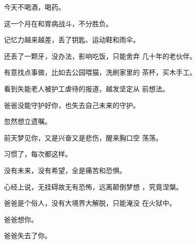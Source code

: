 \documentclass{article}
\begin{document}
\newpage

今天不喝酒，喝药。 


这一个月在和胃病战斗，不分胜负。 

记忆力越来越差，丢了钥匙、运动鞋和雨伞。

还丢了一颗牙，没办法，影响吃饭，只能舍弃
几十年的老伙伴。 

有意找点事做，比如去公园喂猫，洗刷家里的
茶杯，买木手工。 

看到失能老人被护工虐待的报道，越发坚定从
前想法。 

爸爸没能守护好你，也失去自己未来的守护。


忽然想立遗嘱。 

前天梦见你，又是兴奋又是悲伤，醒来胸口空
荡荡。 

\newpage


习惯了，每次都这样。 


没有未来，没有希望，全是痛苦和恐惧。 

心经上说，无挂碍故无有恐怖，远离颠倒梦想
，究竟涅槃。 

爸爸是个俗人，没有大境界大解脱，只能淹没
在火狱中。 



爸爸想你。 

爸爸失去了你。
\end{document}
